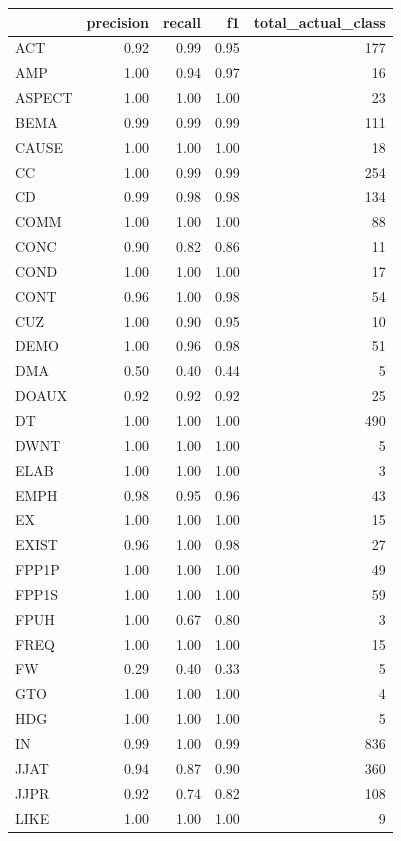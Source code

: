 \documentclass[
  letterpaper,
  DIV=11,
  numbers=noendperiod]{scrreprt}
\begin{document}
\begin{longtable}[]{@{}lrrrr@{}}
\toprule\noalign{}
& precision & recall & f1 & total\_actual\_class \\
\midrule\noalign{}
\endhead
\bottomrule\noalign{}
\endlastfoot
ACT & 0.92 & 0.99 & 0.95 & 177 \\
AMP & 1.00 & 0.94 & 0.97 & 16 \\
ASPECT & 1.00 & 1.00 & 1.00 & 23 \\
BEMA & 0.99 & 0.99 & 0.99 & 111 \\
CAUSE & 1.00 & 1.00 & 1.00 & 18 \\
CC & 1.00 & 0.99 & 0.99 & 254 \\
CD & 0.99 & 0.98 & 0.98 & 134 \\
COMM & 1.00 & 1.00 & 1.00 & 88 \\
CONC & 0.90 & 0.82 & 0.86 & 11 \\
COND & 1.00 & 1.00 & 1.00 & 17 \\
CONT & 0.96 & 1.00 & 0.98 & 54 \\
CUZ & 1.00 & 0.90 & 0.95 & 10 \\
DEMO & 1.00 & 0.96 & 0.98 & 51 \\
DMA & 0.50 & 0.40 & 0.44 & 5 \\
DOAUX & 0.92 & 0.92 & 0.92 & 25 \\
DT & 1.00 & 1.00 & 1.00 & 490 \\
DWNT & 1.00 & 1.00 & 1.00 & 5 \\
ELAB & 1.00 & 1.00 & 1.00 & 3 \\
EMPH & 0.98 & 0.95 & 0.96 & 43 \\
EX & 1.00 & 1.00 & 1.00 & 15 \\
EXIST & 0.96 & 1.00 & 0.98 & 27 \\
FPP1P & 1.00 & 1.00 & 1.00 & 49 \\
FPP1S & 1.00 & 1.00 & 1.00 & 59 \\
FPUH & 1.00 & 0.67 & 0.80 & 3 \\
FREQ & 1.00 & 1.00 & 1.00 & 15 \\
FW & 0.29 & 0.40 & 0.33 & 5 \\
GTO & 1.00 & 1.00 & 1.00 & 4 \\
HDG & 1.00 & 1.00 & 1.00 & 5 \\
IN & 0.99 & 1.00 & 0.99 & 836 \\
JJAT & 0.94 & 0.87 & 0.90 & 360 \\
JJPR & 0.92 & 0.74 & 0.82 & 108 \\
LIKE & 1.00 & 1.00 & 1.00 & 9 \\

\end{longtable}
\end{document}
